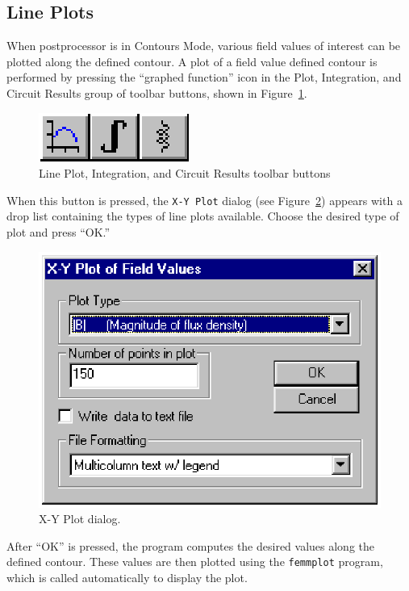 \documentclass[12pt]{report}
\begin{document}
\subsection{Line Plots}

When postprocessor is in Contours Mode, various field values of
interest can be plotted along the defined contour.  A plot of a
field value defined contour is performed by pressing the ``graphed
function'' icon in the Plot, Integration, and Circuit Results group of toolbar
buttons, shown in Figure~\ref{choadbar}.
\begin{figure}
\centerline{\includegraphics{intplot.ps}}
\caption{Line Plot, Integration, and Circuit Results toolbar buttons}
\label{choadbar}
\end{figure}
When this button is pressed, the {\tt X-Y Plot} dialog (see
Figure~\ref{plot_dlg}) appears with a drop list containing the
types of line plots available. Choose the desired type of plot and
press ``OK.''
\begin{figure}[ht]
\centerline{\includegraphics{pltdlg.ps}}
\caption{X-Y Plot dialog.}
\label{plot_dlg}
\end{figure}

After ``OK'' is pressed, the program computes the desired values
along the defined contour.  These values are then plotted using the
{\tt femmplot} program, which is called automatically to display
the plot.
\end{document}
